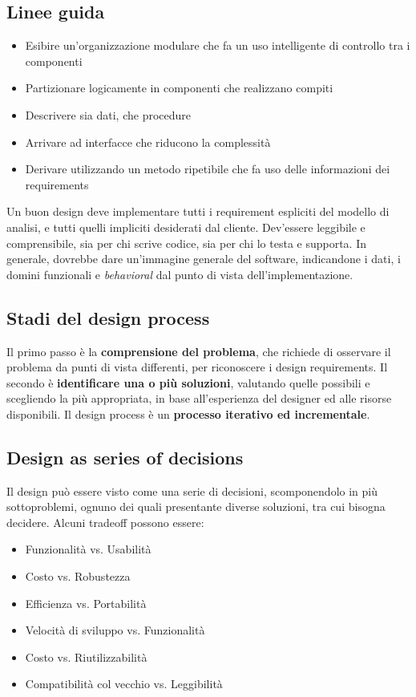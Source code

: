 \documentclass[11pt]{article}
\begin{document}
\subsection{Linee guida}
\begin{itemize}
    \item Esibire un'organizzazione modulare che fa un uso intelligente di controllo tra i componenti
    \item Partizionare logicamente in componenti che realizzano compiti
    \item Descrivere sia dati, che procedure 
    \item Arrivare ad interfacce che riducono la complessità
    \item Derivare utilizzando un metodo ripetibile che fa uso delle informazioni dei requirements 
\end{itemize}
Un buon design deve implementare tutti i requirement espliciti del modello di analisi, e tutti quelli impliciti desiderati dal cliente. Dev'essere leggibile e comprensibile, sia per chi scrive codice, sia per chi lo testa e supporta. In generale, dovrebbe dare un'immagine generale del software, indicandone i dati, i domini funzionali e \textit{behavioral} dal punto di vista dell'implementazione. 
\subsection{Stadi del design process}
Il primo passo è la \textbf{comprensione del problema}, che richiede di osservare il problema da punti di vista differenti, per riconoscere i design requirements. Il secondo è \textbf{identificare una o più soluzioni}, valutando quelle possibili e scegliendo la più appropriata, in base all'esperienza del designer ed alle risorse disponibili. Il design process è un \textbf{processo iterativo ed incrementale}. 
\subsection{Design as series of decisions}
Il design può essere visto come una serie di decisioni, scomponendolo in più sottoproblemi, ognuno dei quali presentante diverse soluzioni, tra cui bisogna decidere. 
Alcuni tradeoff possono essere:
\begin{itemize}
    \item Funzionalità vs. Usabilità
    \item Costo vs. Robustezza 
    \item Efficienza vs. Portabilità 
    \item Velocità di sviluppo vs. Funzionalità 
    \item Costo vs. Riutilizzabilità 
    \item Compatibilità col vecchio vs. Leggibilità 
\end{itemize}
\end{document}
